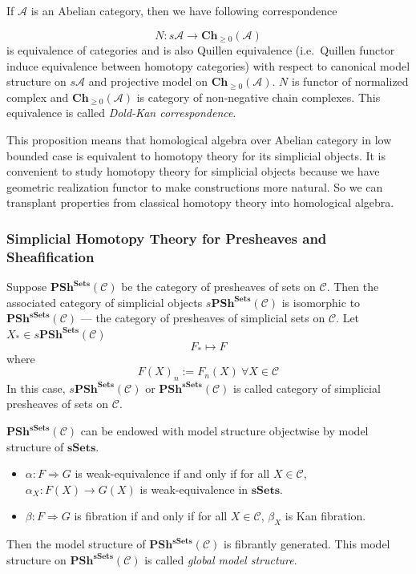 \documentclass[b5paper,11pt]{article}
\begin{document}
If $\mathcal{A}$ is  an Abelian category, then we have following correspondence
\begin{secprop}
\[
N \colon s\mathcal{A} \to \mathbf{Ch}_{\geq 0} (\mathcal{A})
\]
is equivalence of categories and is also Quillen equivalence (i.e.\ Quillen functor induce equivalence between homotopy categories) with respect to canonical model structure on $s\mathcal{A}$ and projective model on $\mathbf{Ch}_{\geq 0 } (\mathcal{A})$. $N$ is functor of normalized complex and $\mathbf{Ch}_{\geq 0}(\mathcal{A})$ is category of non-negative chain complexes. This equivalence is called \emph{Dold-Kan correspondence}.
\end{secprop}
This proposition means that homological algebra over Abelian category in low bounded case is equivalent to homotopy theory for its simplicial objects. It is convenient to study homotopy theory for simplicial objects because we have geometric realization functor to make constructions more natural. So we can transplant properties from classical homotopy theory into homological algebra.
\subsubsection{Simplicial Homotopy Theory for Presheaves and Sheafification}
Suppose $\mathbf{PSh}^{\mathbf{Sets}}(\mathcal{C})$ be the category of presheaves of sets on $\mathcal{C}$. Then the associated category of simplicial objects $s\mathbf{PSh^{Sets}}(\mathcal{C})$ is isomorphic to $\mathbf{PSh^{sSets}}(\mathcal{C})$ --- the category of presheaves of simplicial sets on $\mathcal{C}$. Let $X_* \in s\mathbf{PSh^{Sets}}(\mathcal{C})$
\[
F_* \mapsto F
\]
where \[
F(X)_n := F_n(X) \ \forall X \in \mathcal{C}
\]
In this case, $s\mathbf{PSh^{Sets}}(\mathcal{C})$ or $\mathbf{PSh^{sSets}}(\mathcal{C})$ is called category of simplicial presheaves of sets on $\mathcal{C}$.

$\mathbf{PSh^{sSets}}(\mathcal{C})$ can be endowed with model structure objectwise by model structure of $\mathbf{sSets}$.
\begin{itemize}
	\item $\alpha \colon F \Rightarrow G$ is weak-equivalence if and only if for all $X \in \mathcal{C}$, $\alpha_X: F(X) \to G(X)$ is weak-equivalence in $\mathbf{sSets}$.
	\item $\beta\colon F \Rightarrow G$ is fibration if and only if for all $X \in \mathcal{C}$, $\beta_X$ is Kan fibration.
\end{itemize}
Then the model structure of $\mathbf{PSh^{sSets}}(\mathcal{C})$ is fibrantly generated. This model structure on $\mathbf{PSh^{sSets}}(\mathcal{C})$ is called \emph{global model structure}.
\end{document}
